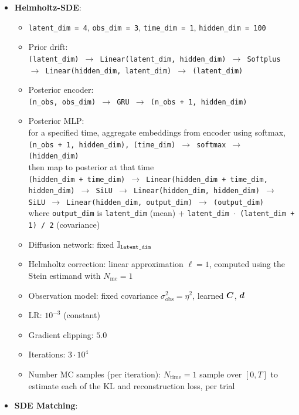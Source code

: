 \begin{itemize}
    \item \textbf{Helmholtz-SDE}:
    \begin{itemize}
        \item \texttt{latent\_dim = 4}, \texttt{obs\_dim = 3},  \texttt{time\_dim = 1}, \texttt{hidden\_dim = 100}
        \item 
        Prior drift:\\
        \texttt{(latent\_dim) $\to$ Linear(latent\_dim, hidden\_dim) $\to$ Softplus $\to$ Linear(hidden\_dim, latent\_dim) $\to$ (latent\_dim)}
        \item Posterior encoder:\\ \texttt{(n\_obs, obs\_dim) $\to$ GRU $\to$ (n\_obs + 1, hidden\_dim)}
        \item Posterior MLP:\\ 
        for a specified time, aggregate embeddings from encoder using softmax, \\
        \texttt{(n\_obs + 1, hidden\_dim), (time\_dim) $\to$ softmax $\to$  (hidden\_dim)}\\
        then map to posterior at that time\\
        \texttt{(hidden\_dim + time\_dim) $\to$ Linear(hidden\_dim + time\_dim, hidden\_dim) $\to$ SiLU  $\to$ Linear(hidden\_dim, hidden\_dim) $\to$ SiLU $\to$ Linear(hidden\_dim, output\_dim) $\to$ (output\_dim)}\\
        where \texttt{output\_dim} is \texttt{latent\_dim} (mean) + \texttt{latent\_dim $\cdot$ (latent\_dim + 1) / 2} (covariance)
        \item Diffusion network: fixed $\mathbb{I}_{\texttt{latent\_dim}}$
        \item Helmholtz correction: linear approximation $\ell = 1$, computed using the Stein estimand with $N_{\mathrm{mc}} = 1$
        \item Observation model: fixed covariance $\sigma_{\mathrm{obs}}^2 = \eta^2$, learned $\boldsymbol{C}$, $\boldsymbol{d}$
        \item LR: $10^{-3}$ (constant)
        \item Gradient clipping: $5.0$
        \item Iterations: $3 \cdot 10^4$
        \item Number MC samples (per iteration): $N_{\mathrm{time}} = 1$ sample over $[0, T]$ to estimate each of the KL and reconstruction loss, per trial
    \end{itemize}
    \item \textbf{SDE Matching}:

\end{itemize}

